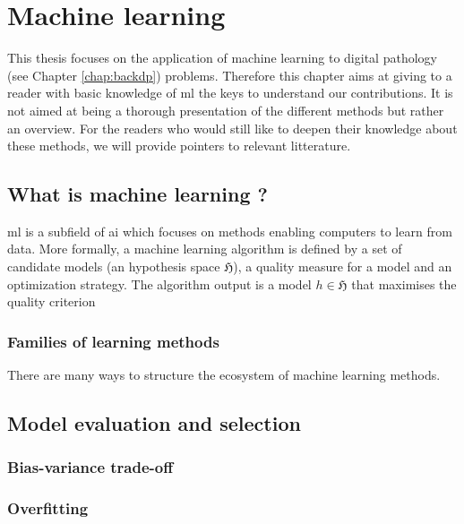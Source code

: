 \chapter{Machine learning}
\label{chap:backml}

This thesis focuses on the application of machine learning to digital pathology (see Chapter \ref{chap:backdp}) problems. Therefore this chapter aims at giving to a reader with basic knowledge of \acrshort{ml} the keys to understand our contributions. It is not aimed at being a thorough presentation of the different methods but rather an overview. For the readers who would still like to deepen their knowledge about these methods, we will provide pointers to relevant litterature.  

\section{What is machine learning ?} 
\label{sec:backml:whatisml}

\acrlong{ml} is a subfield of \acrlong{ai} which focuses on methods enabling computers to learn from data. More formally, a machine learning algorithm is defined by a set of candidate models (\ie an hypothesis space $\mathfrak{H}$), a quality measure for a model and an optimization strategy. The algorithm output is a model $h \in \mathfrak{H}$ that maximises the quality criterion 

\subsection{Families of learning methods}

There are many ways to structure the ecosystem of machine learning methods.  


\section{Model evaluation and selection}

\subsection{Bias-variance trade-off}

\subsection{Overfitting}

